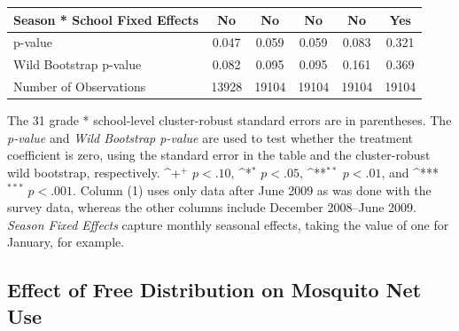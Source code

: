 \documentclass[fleqn,11pt]{article}
\newcommand{\sym}[1]{\rlap{$#1$}}
\def\sym#1{\ifmmode^{#1}\else\(^{#1}\)\fi
}
\begin{document}
\begin{table}[h]
\begin{adjustbox}{max width=\textwidth}
\begin{threeparttable}
\begin{tabular}{l*{5}{c}}
Season * School Fixed Effects   &          No         &          No         &          No         &          No         &         Yes         \\
\hline
   p-value&       0.047         &       0.059         &       0.059         &       0.083         &       0.321  \\
Wild Bootstrap p-value &       0.082         &       0.095         &       0.095         &       0.161         &       0.369         \\
Number of Observations        &       13928         &       19104         &       19104         &       19104         &       19104         \\
\hline\hline
\end{tabular}
\begin{tablenotes}
\item The 31 grade * school-level cluster-robust standard errors are in parentheses. The \textit{p-value} and \textit{Wild Bootstrap p-value} are used to test whether the treatment coefficient is zero, using the standard error in the table and the cluster-robust wild bootstrap, respectively. \sym{+} \(p<.10\), \sym{*} \(p<.05\), \sym{**} \(p<.01\), and \sym{***} \(p<.001\). Column (1) uses only data after June 2009 as was done with the survey data, whereas the other columns include December 2008--June 2009.  \textit{Season Fixed Effects} capture monthly seasonal effects, taking the value of one for January, for example.
\end{tablenotes}
\end{threeparttable}
\end{adjustbox}
\end{table}


% 

\subsection{Effect of Free Distribution on Mosquito Net Use}
\end{document}
